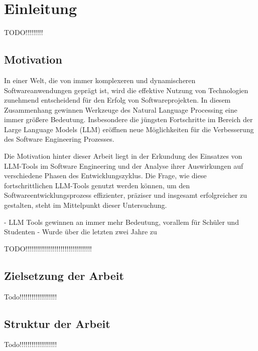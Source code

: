 
\chapter{Einleitung} 

TODO!!!!!!!!!

\section{Motivation}  \label{Motivation}

In einer Welt, die von immer komplexeren und dynamischeren Softwareanwendungen geprägt ist, wird die effektive Nutzung von Technologien zunehmend entscheidend für den Erfolg von  
Softwareprojekten. In diesem Zusammenhang gewinnen Werkzeuge des Natural Language Processing eine immer größere Bedeutung. Insbesondere die jüngsten Fortschritte im Bereich der Large  
Language Models (LLM) eröffnen neue Möglichkeiten für die Verbesserung des Software Engineering Prozesses.

Die Motivation hinter dieser Arbeit liegt in der Erkundung des Einsatzes von LLM-Tools im Software Engineering und der Analyse ihrer Auswirkungen auf verschiedene Phasen des  
Entwicklungszyklus. Die Frage, wie diese fortschrittlichen LLM-Tools genutzt werden können, um den Softwareentwicklungsprozess effizienter, präziser und insgesamt erfolgreicher zu  
gestalten, steht im Mittelpunkt dieser Untersuchung. 

- LLM Tools gewinnen an immer mehr Bedeutung, vorallem für Schüler und Studenten
- Wurde über die letzten zwei Jahre zu 

TODO!!!!!!!!!!!!!!!!!!!!!!!!!!!!!!!!!!

\section{Zielsetzung der Arbeit}  \label{Zielsetzung der Arbeit}

Todo!!!!!!!!!!!!!!!!!!!

\section{Struktur der Arbeit}  \label{Struktur der Arbeit}

Todo!!!!!!!!!!!!!!!!!!!
